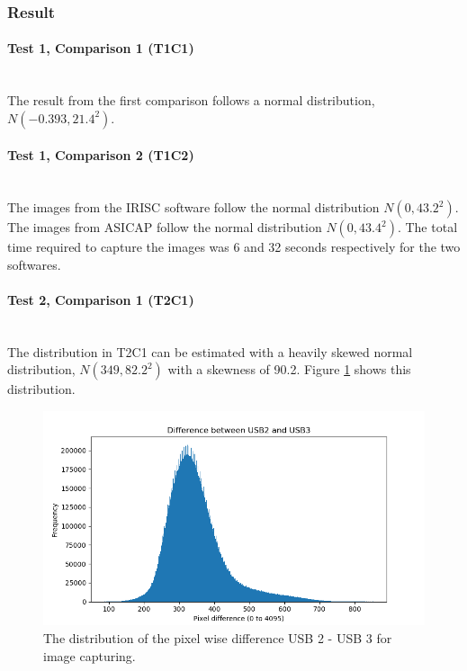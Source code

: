 \subsubsection*{Result}

\paragraph{Test 1, Comparison 1 (T1C1)}\,\\

The result from the first comparison follows a normal distribution, $ N( -0.393, 21.4^2 ) $.

\paragraph{Test 1, Comparison 2 (T1C2)}\,\\

The images from the IRISC software follow the normal distribution $ N( 0, 43.2^2 ) $.
The images from ASICAP follow the normal distribution $ N( 0, 43.4^2 ) $.
The total time required to capture the images was 6 and 32 seconds respectively for the two softwares.

\paragraph{Test 2, Comparison 1 (T2C1)}\,\\

The distribution in T2C1 can be estimated with a heavily skewed normal distribution, $ N( 349, 82.2^2 ) $ with a skewness of 90.2. Figure \ref{usb_comp} shows this distribution.

\begin{figure}[H]
    \includegraphics[width=\textwidth]{appendix/img/test-results/camera_software_test.png}
    \caption{The distribution of the pixel wise difference USB 2 - USB 3 for image capturing.}
    \label{usb_comp}
\end{figure}

